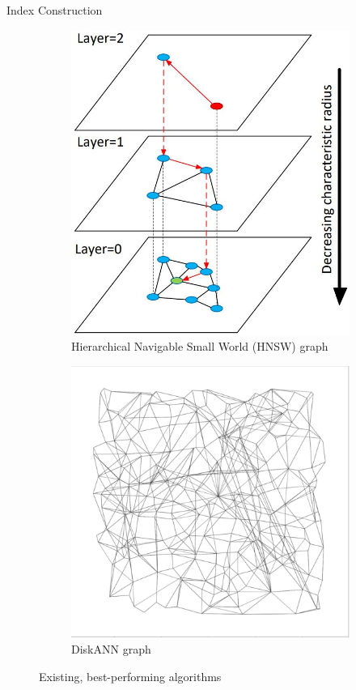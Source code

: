 {Index Construction}
    \begin{figure}[ht]
        \centering
        \hfill
        \begin{subfigure}{0.49\textwidth}
            \centering
            \includegraphics[height=0.6\textheight]{images/hnsw}
            \caption{Hierarchical Navigable Small World (HNSW) graph}
        \end{subfigure}
        \hfill
        \begin{subfigure}{0.49\textwidth}
            \centering
            \includegraphics[height=0.6\textheight]{images/diskann}
            \caption{DiskANN graph}
        \end{subfigure}
        \hfill
        \caption{Existing, best-performing algorithms}
    \end{figure}


